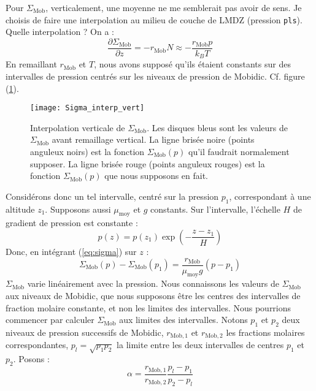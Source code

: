 \documentclass[a4paper,english,french]{article}
\begin{document}
Pour $\Sigma_\mathrm{Mob}$, verticalement, une moyenne ne me
semblerait pas avoir de sens. Je choisis de faire une interpolation au
milieu de couche de LMDZ (pression \verb+pls+). Quelle interpolation ?
On a :
\begin{equation}
  \label{eq:sigma}
  \frac{\partial \Sigma_\mathrm{Mob}}{\partial z} = - r_\mathrm{Mob} N \approx - \frac{r_\mathrm{Mob} p}{k_B T}
\end{equation}
En remaillant $r_\mathrm{Mob}$ et $T$, nous avons supposé qu'ils
étaient constants sur des intervalles de pression centrés sur les
niveaux de pression de Mobidic. Cf. figure
(\ref{fig:Sigma_interp_vert}).
\begin{figure}[htbp]
  \centering
  \texttt{[image: Sigma\_interp\_vert]}
  \caption[Interpolation verticale de
  $\Sigma_\mathrm{Mob}$]{Interpolation verticale de
    $\Sigma_\mathrm{Mob}$. Les disques bleus sont les valeurs de
    $\Sigma_\mathrm{Mob}$ avant remaillage vertical. La ligne brisée
    noire (points anguleux noirs) est la fonction
    $\Sigma_\mathrm{Mob}(p)$ qu'il faudrait normalement supposer. La
    ligne brisée rouge (points anguleux rouges) est la fonction
    $\Sigma_\mathrm{Mob}(p)$ que nous supposons en fait.}
  \label{fig:Sigma_interp_vert}
\end{figure}
Considérons donc un tel intervalle, centré sur la pression $p_1$,
correspondant à une altitude $z_1$.  Supposons aussi
$\mu_\mathrm{moy}$ et $g$ constants. Sur l'intervalle, l'échelle $H$
de gradient de pression est constante :
\begin{displaymath}
  p(z) = p(z_1) \exp\left(- \frac{z - z_1}{H}\right)
\end{displaymath}
Donc, en intégrant (\ref{eq:sigma}) sur $z$ :
\begin{displaymath}
  \Sigma_\mathrm{Mob}(p) - \Sigma_\mathrm{Mob}(p_1) = \frac{r_\mathrm{Mob}}{\mu_\mathrm{moy} g} (p - p_1)
\end{displaymath}
$\Sigma_\mathrm{Mob}$ varie linéairement avec la pression. Nous
connaissons les valeurs de $\Sigma_\mathrm{Mob}$ aux niveaux de
Mobidic, que nous supposons être les centres des intervalles de
fraction molaire constante, et non les limites des intervalles. Nous
pourrions commencer par calculer $\Sigma_\mathrm{Mob}$ aux limites des
intervalles. Notons $p_1$ et $p_2$ deux niveaux de pression successifs
de Mobidic, $r_{\mathrm{Mob},1}$ et $r_{\mathrm{Mob},2}$ les fractions
molaires correspondantes, $p_l = \sqrt{p_1 p_2}$ la limite entre les
deux intervalles de centres $p_1$ et $p_2$. Posons :
\begin{displaymath}
  \alpha = \frac{r_{\mathrm{Mob},1}}{r_{\mathrm{Mob},2}} \frac{p_l - p_1}{p_2 - p_l}
\end{displaymath}
\end{document}
